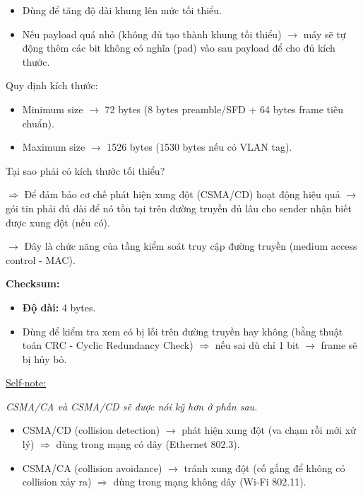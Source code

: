 \begin{itemize}
    \item[$\rightarrow$] Dùng để tăng độ dài khung lên mức tối thiểu.
    \item[$\Rightarrow$] Nếu payload quá nhỏ (không đủ tạo thành khung tối thiểu) $\rightarrow$ máy sẽ tự động thêm các bit không có nghĩa (pad) vào sau payload để cho đủ kích thước.
\end{itemize}
\medskip

\noindent
Quy định kích thước:

\begin{itemize}
    \item Minimum size $\rightarrow$ 72 bytes (8 bytes preamble/SFD + 64 bytes frame tiêu chuẩn).
    \item Maximum size $\rightarrow$ 1526 bytes (1530 bytes nếu có VLAN tag).
\end{itemize}
\medskip

\noindent
Tại sao phải có kích thước tối thiểu?
\medskip

\noindent
$\Rightarrow$ Để đảm bảo cơ chế phát hiện xung đột (CSMA/CD) hoạt động hiệu quả $\rightarrow$ gói tin phải đủ dài để nó tồn tại trên đường truyền đủ lâu cho sender nhận biết được xung đột (nếu có).

$\rightarrow$ Đây là chức năng của tầng kiểm soát truy cập đường truyền (medium access control - MAC).
\medskip

\noindent
\textbf{Checksum:}

\begin{itemize}
    \item \textbf{Độ dài:} 4 bytes.
    \item[$\rightarrow$] Dùng để kiểm tra xem có bị lỗi trên đường truyền hay không (bằng thuật toán CRC - Cyclic Redundancy Check) $\Rightarrow$ nếu sai dù chỉ 1 bit $\rightarrow$ frame sẽ bị hủy bỏ.
\end{itemize}
\medskip

\noindent
\underline{Self-note:}
\medskip

\noindent
\textit{CSMA/CA và CSMA/CD sẽ được nói kỹ hơn ở phần sau.}

\begin{itemize}
    \item CSMA/CD (collision detection) $\rightarrow$ phát hiện xung đột (va chạm rồi mới xử lý) $\Rightarrow$ dùng trong mạng có dây (Ethernet 802.3).
    \item CSMA/CA (collision avoidance) $\rightarrow$ tránh xung đột (cố gắng để không có collision xảy ra) $\Rightarrow$ dùng trong mạng không dây (Wi-Fi 802.11).
\end{itemize}
\medskip

